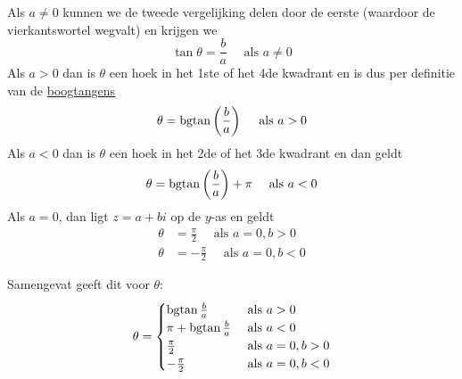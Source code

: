 \documentclass{ximera}
\begin{document}
 
 

 

 
 
\begin{remark}\nl
     
    Als $a \neq 0$ kunnen we de tweede vergelijking delen door de eerste (waardoor de vierkantswortel wegvalt) en krijgen we
    $$
    \tan \theta = \frac{b}{a}  \quad \text{ als } a \neq 0
    $$
    Als $a >0$ dan is $\theta$ een hoek in het 1ste of het 4de kwadrant en is dus per definitie van de \hyperref[xim:cyclometrische_functies]{boogtangens }
    $$
    \theta  =  \operatorname{bgtan} \left(\frac{b}{a}\right) \quad \text{ als }  a>0
    $$
    Als $a<0$ dan is $\theta$ een hoek in het 2de of het 3de kwadrant en dan geldt
    $$
    \theta  =  \operatorname{bgtan} \left(\frac{b}{a}\right) + \pi \quad \text{ als }  a<0
    $$
    Als $a=0$, dan ligt $z=a+bi$ op de $y$-as en geldt
    \begin{align*}
    \theta & =  \frac{\pi}{2}  \quad\text{ als } a=0, b > 0\\
    \theta & = -\frac{\pi}{2} \quad\text{ als } a=0, b < 0
    \end{align*}
     
    Samengevat geeft dit voor $\theta$:
    $$
    \theta = \begin{cases}
    \bgtan \frac{b}{a}       & \text{ als } a>0        \\
    \pi + \bgtan \frac{b}{a} & \text{ als } a<0        \\   %
    \frac{\pi}{2}            & \text{ als } a=0, b > 0 \\
    -\frac{\pi}{2}           & \text{ als } a=0, b < 0
    \end{cases}
    $$


 
\end{remark}
 
 
 
\end{document}
